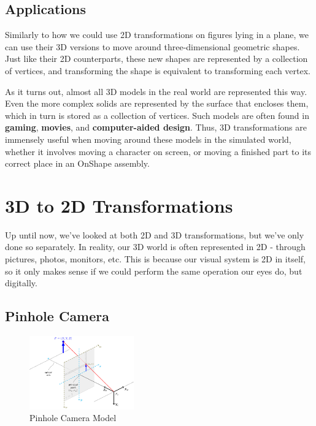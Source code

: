 \documentclass{article}
\begin{document}
\subsection{Applications}
Similarly to how we could use 2D transformations on figures lying in a plane, we can use their 3D versions to move around three-dimensional geometric shapes. Just like their 2D counterparts, these new shapes are represented by a collection of vertices, and transforming the shape is equivalent to transforming each vertex.

As it turns out, almost all 3D models in the real world are represented this way. Even the more complex solids are represented by the surface that encloses them, which in turn is stored as a collection of vertices. Such models are often found in \textbf{gaming}, \textbf{movies}, and \textbf{computer-aided design}. Thus, 3D transformations are immensely useful when moving around these models in the simulated world, whether it involves moving a character on screen, or moving a finished part to its correct place in an OnShape assembly.

\section{3D to 2D Transformations}
Up until now, we've looked at both 2D and 3D transformations, but we've only done so separately. In reality, our 3D world is often represented in 2D - through pictures, photos, monitors, etc. This is because our visual system is 2D in itself, so it only makes sense if we could perform the same operation our eyes do, but digitally.

\subsection{Pinhole Camera}
\begin{figure}
  \begin{center}
    \vspace{-55pt}
    \includegraphics[width=0.4\textwidth]{pinhole_camera_model.png}
    \vspace{-15pt}
  \end{center}
  \caption{Pinhole Camera Model}
\end{figure}
\end{document}
